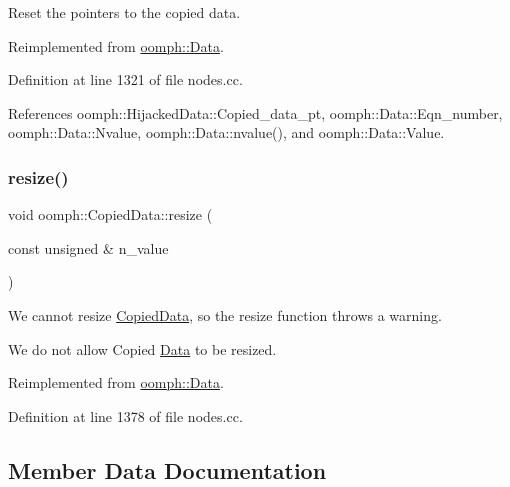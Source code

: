Reset the pointers to the copied data. 



Reimplemented from \hyperlink{classoomph_1_1Data_afd33533f3ddf61bc34106a4dc72de541}{oomph\+::\+Data}.



Definition at line 1321 of file nodes.\+cc.



References oomph\+::\+Hijacked\+Data\+::\+Copied\+\_\+data\+\_\+pt, oomph\+::\+Data\+::\+Eqn\+\_\+number, oomph\+::\+Data\+::\+Nvalue, oomph\+::\+Data\+::nvalue(), and oomph\+::\+Data\+::\+Value.

\mbox{\label{classoomph_1_1CopiedData_aa7c48fb5ea17cd42260965bf2c800b3d}} 
\subsubsection{\texorpdfstring{resize()}{resize()}}
{\footnotesize\ttfamily void oomph\+::\+Copied\+Data\+::resize (\begin{DoxyParamCaption}\item[{const unsigned \&}]{n\+\_\+value }\end{DoxyParamCaption})\hspace{0.3cm}{\ttfamily [virtual]}}



We cannot resize \hyperlink{classoomph_1_1CopiedData}{Copied\+Data}, so the resize function throws a warning. 

We do not allow Copied \hyperlink{classoomph_1_1Data}{Data} to be resized. 

Reimplemented from \hyperlink{classoomph_1_1Data_ac68583834c9bef47f5c37c890960e186}{oomph\+::\+Data}.



Definition at line 1378 of file nodes.\+cc.



\subsection{Member Data Documentation}
\mbox{\label{classoomph_1_1CopiedData_a592934e0ca9ade33ed91a7f74c091864}} 
